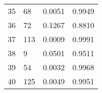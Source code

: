 \begin{table}[ht]
\begin{tabular}{llll}
35 & 68 & 0.0051 & 0.9949 \\
36 & 72 & 0.1267 & 0.8810 \\
37 & 113 & 0.0009 & 0.9991 \\
38 & 9 & 0.0501 & 0.9511 \\
39 & 54 & 0.0032 & 0.9968 \\
40 & 125 & 0.0049 & 0.9951 \\

\end{tabular}
\end{table}
